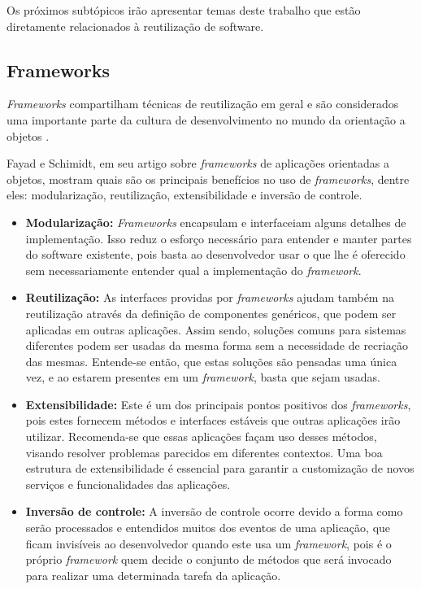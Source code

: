 Os próximos subtópicos irão apresentar temas deste trabalho que estão diretamente relacionados à reutilização de software.

\subsection{Frameworks}

\textit{Frameworks} compartilham técnicas de reutilização em geral e são considerados uma importante parte da cultura de desenvolvimento no mundo da orientação a objetos \cite{Johnson:1997}.

Fayad e Schimidt, em seu artigo \cite{Fayad:Schimidt:1997} sobre \textit{frameworks} de aplicações orientadas a objetos, mostram quais são os principais benefícios no uso de \textit{frameworks}, dentre eles: modularização, reutilização, extensibilidade e inversão de controle.

\begin{itemize}
	\item \textbf{Modularização:} \textit{Frameworks} encapsulam e interfaceiam alguns detalhes de implementação. Isso reduz o esforço necessário para entender e manter partes do software existente, pois basta ao desenvolvedor usar o que lhe é oferecido sem necessariamente entender qual a implementação do \textit{framework}.

	\item \textbf{Reutilização:} As interfaces providas por \textit{frameworks} ajudam também na reutilização através da definição de componentes genéricos, que podem ser aplicadas em outras aplicações. Assim sendo, soluções comuns para sistemas diferentes podem ser usadas da mesma forma sem a necessidade de recriação das mesmas. Entende-se então, que estas soluções são pensadas uma única vez, e ao estarem presentes em um \textit{framework}, basta que sejam usadas.

	\item \textbf{Extensibilidade:} Este é um dos principais pontos positivos dos \textit{frameworks}, pois estes fornecem métodos e interfaces estáveis que outras aplicações irão utilizar. Recomenda-se que essas aplicações façam uso desses métodos, visando resolver problemas parecidos em diferentes contextos. Uma boa estrutura de extensibilidade é essencial para garantir a customização de novos serviços e funcionalidades das aplicações.

	\item \textbf{Inversão de controle:} A inversão de controle ocorre devido a forma como serão processados e entendidos muitos dos eventos de uma aplicação, que ficam invisíveis ao desenvolvedor quando este usa um \textit{framework}, pois é o próprio \textit{framework} quem decide o conjunto de métodos que será invocado para realizar uma determinada tarefa da aplicação.
\end{itemize}

